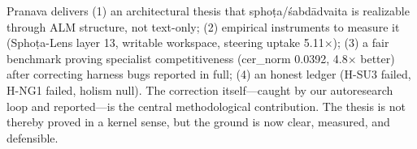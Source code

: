 \documentclass[11pt]{article}
\begin{document}
Pranava delivers (1) an architectural thesis that sphoṭa/śabdādvaita is realizable through ALM structure, not text-only; (2) empirical instruments to measure it (Sphoṭa-Lens layer 13, writable workspace, steering uptake 5.11$\times$); (3) a fair benchmark proving specialist competitiveness (cer\_norm 0.0392, 4.8$\times$ better) after correcting harness bugs reported in full; (4) an honest ledger (H-SU3 failed, H-NG1 failed, holism null). The correction itself---caught by our autoresearch loop and reported---is the central methodological contribution. The thesis is not thereby proved in a kernel sense, but the ground is now clear, measured, and defensible.
\end{document}
